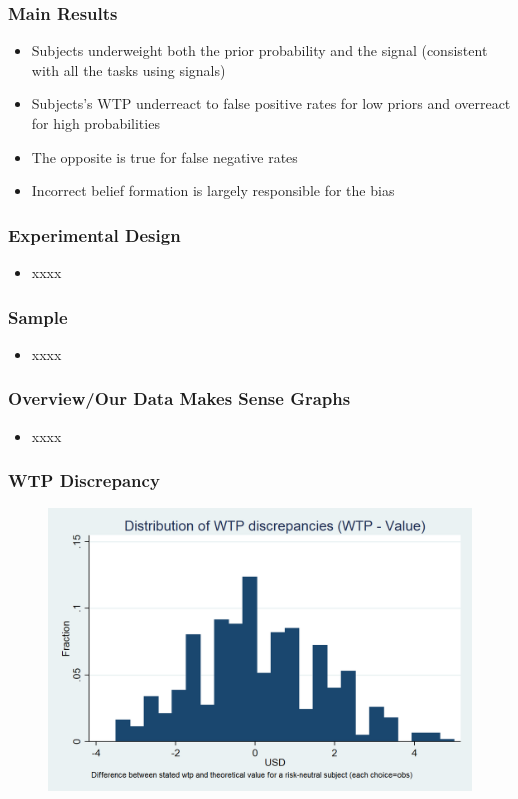\documentclass[11pt,hyperref={bookmarks=false}]{beamer}
\begin{document}
\begin{frame}
\frametitle{Main Results}
\begin{itemize}
\item Subjects underweight both the prior probability and the signal (consistent with all the tasks using signals)
\item Subjects's WTP underreact to false positive rates for low priors and overreact for high probabilities
\item The opposite is true for false negative rates
\item Incorrect belief formation is largely responsible for the bias
\end{itemize}
\end{frame}



\begin{frame}
\frametitle{Experimental Design}
\begin{itemize}
\item xxxx
\end{itemize}
\end{frame}


\begin{frame}
\frametitle{Sample}
\begin{itemize}
\item xxxx
\end{itemize}
\end{frame}


\begin{frame}
\frametitle{Overview/Our Data Makes Sense Graphs}
\begin{itemize}
\item xxxx
\end{itemize}
\end{frame}



\begin{frame}
\frametitle{WTP Discrepancy}
\begin{figure}[h]
\includegraphics[scale=0.25]{Graphs/hist_WTP_discr1.png}
\end{figure}
\end{frame}
\end{document}
